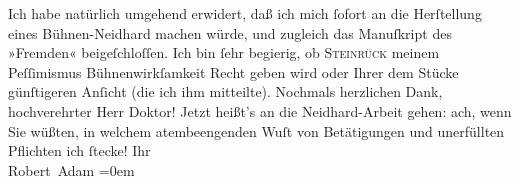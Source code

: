 \begin{ledgroupsized}[t]{13cm}
           \pstart
           Ich habe natürlich umgehend erwidert, daß ich mich ſofort an die Herſtellung eines
                  Bühnen-Neidhard machen würde, und zugleich
               das Manuſkript des »Fremden« beigeſchloſſen. Ich
               bin ſehr begierig, ob \textsc{Steinrück} meinem Peſſimismus \label{K_L02249-1v}\label{K_L02249-1h}
               Bühnenwirkſamkeit Recht geben wird oder Ihrer dem Stücke günſtigeren Anſicht (die ich
               ihm mitteilte).\pend
           \pstart
           Nochmals herzlichen Dank, hochverehrter Herr Doktor! Jetzt heißt’s an die Neidhard-Arbeit gehen: ach, wenn Sie wüßten, in
               welchem atembeengenden Wuſt von Be{\pb}tätigungen und
               unerfüllten Pflichten ich ſtecke!\pend
           \pstart
           Ihr{\\[\baselineskip]}\spacefill\mbox{Robert Adam}\pend
           \leftskip=0em{}
         
         \endnumbering{}\end{ledgroupsized}  \newcommand{\dateiname}{L02249}\newcommand{\titel}{Robert Adam an Arthur Schnitzler, 9. 12. 1916}\newcommand{\editorInnen}{Martin Anton Müller und Gerd-Hermann Susen}
      